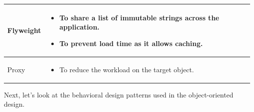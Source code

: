 \begin{table}[htbp]
{\begin{tabular}{|p{}|p{}|}
\hline
\hfill\break Flyweight \hfill\break & \begin{itemize} \tightlist \item To share a list of immutable strings across the application. \item To prevent load time as it allows caching. \end{itemize} \\
\hline
Proxy & \begin{itemize} \tightlist \item To reduce the workload on the target object. \end{itemize} \\
\hline
\end{tabular}
}
\end{table}

Next, let's look at the behavioral design patterns used in the object-oriented design.

